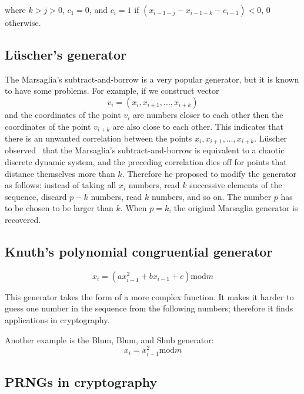 \documentclass[justified,sixbynine]{tufte-book}
\theoremstyle{plain}%
\theoremstyle{definition}
\theoremstyle{remark}
\begin{document}
\begin{fullwidth}
where $k>j>0$, $c_1=0$, and $c_i=1$ if $(x_{i-1-j}-x_{i-1-k}-c_{i-1})<0$, $0$
otherwise.

\goodbreak\subsection{L\"uscher's generator}

The Marsaglia's subtract-and-borrow is a very popular generator, but it is known
to have some problems. For example, if we construct vector
\begin{equation}
v_i=(x_i,x_{i+1},\dots,x_{i+k})
\end{equation}
and the coordinates of the point $v_i$ are numbers closer to each other then
the coordinates of the point $v_{i+k}$ are also close to each other. This
indicates that there is an unwanted correlation between the points $%
x_i,x_{i+1},\dots,x_{i+k}$. L\"uscher observed~\cite{lusher} that the Marsaglia's
subtract-and-borrow is equivalent to a chaotic discrete dynamic system, and
the preceding correlation dies off for points that distance themselves more than $k$. Therefore
he proposed to modify the generator as follows: instead of taking all $x_i$
numbers, read $k$ successive elements of the sequence, discard $p-k$
numbers, read $k$ numbers, and so on. The number $p$ has to be chosen to be
larger than $k$. When $p=k$, the original Marsaglia generator is recovered.

\goodbreak\subsection{Knuth's polynomial congruential generator}

\begin{equation}
x_i=(ax_{i-1}^2+bx_{i-1}+c)\textrm{mod}m
\end{equation}

This generator takes the form of a more complex function. It makes it harder to guess one number in the sequence from the following numbers; therefore
it finds applications in cryptography.

Another example is the Blum, Blum, and Shub generator:
\begin{equation}
x_i=x_{i-1}^2\textrm{mod}m
\end{equation}

\goodbreak\subsection{PRNGs in cryptography}


\end{fullwidth}
\end{document}
